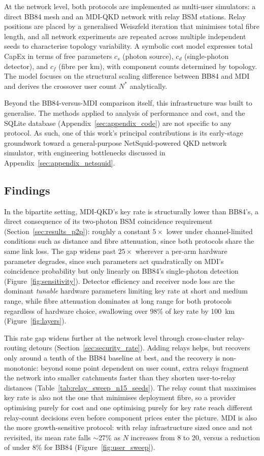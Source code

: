 \documentclass[12pt]{article}
\begin{document}
At the network level, both protocols are implemented as multi-user simulators: a direct BB84 mesh and an MDI-QKD network with relay BSM stations. Relay positions are placed by a generalised Weiszfeld iteration that minimises total fibre length, and all network experiments are repeated across multiple independent seeds to characterise topology variability. A symbolic cost model expresses total CapEx in terms of free parameters $c_s$ (photon source), $c_d$ (single-photon detector), and $c_f$ (fibre per km), with component counts determined by topology. The model focuses on the structural scaling difference between BB84 and MDI and derives the crossover user count $N^*$ analytically.

Beyond the BB84-versus-MDI comparison itself, this infrastructure was built to generalise. The methods applied to analysis of performance and cost, and the SQLite database (Appendix~\ref{sec:appendix_code}) are not specific to any protocol. As such, one of this work's principal contributions is its early-stage groundwork toward a general-purpose NetSquid-powered QKD network simulator, with engineering bottlenecks discussed in Appendix~\ref{sec:appendix_netsquid}.

\subsection{Findings}

In the bipartite setting, MDI-QKD's key rate is structurally lower than BB84's, a direct consequence of its two-photon BSM coincidence requirement (Section~\ref{sec:results_p2p}): roughly a constant $5\times$ lower under channel-limited conditions such as distance and fibre attenuation, since both protocols share the same link loss. The gap widens past $25\times$ wherever a per-arm hardware parameter degrades, since such parameters act quadratically on MDI's coincidence probability but only linearly on BB84's single-photon detection (Figure~\ref{fig:sensitivity}). Detector efficiency and receiver node loss are the dominant \emph{tunable} hardware parameters limiting key rate at short and medium range, while fibre attenuation dominates at long range for both protocols regardless of hardware choice, swallowing over 98\% of key rate by 100~km (Figure~\ref{fig:layers}).

This rate gap widens further at the network level through cross-cluster relay-routing detours (Section~\ref{sec:security_rate}). Adding relays helps, but recovers only around a tenth of the BB84 baseline at best, and the recovery is non-monotonic: beyond some point dependent on user count, extra relays fragment the network into smaller catchments faster than they shorten user-to-relay distances (Table~\ref{tab:relay_sweep_n15_seeds}). The relay count that maximises key rate is also not the one that minimises deployment fibre, so a provider optimising purely for cost and one optimising purely for key rate reach different relay-count decisions even before component prices enter the picture. MDI is also the more growth-sensitive protocol: with relay infrastructure sized once and not revisited, its mean rate falls $\sim$27\% as $N$ increases from 8 to 20, versus a reduction of under 8\% for BB84 (Figure~\ref{fig:user_sweep}).
\end{document}
